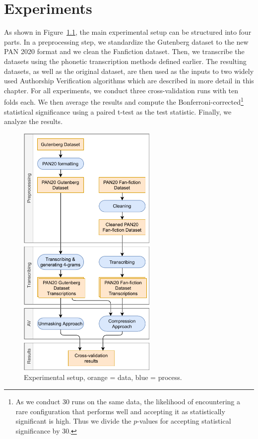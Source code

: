 \chapter{Experiments}\label{experiments}
As shown in Figure~\ref{fig:process}, the main experimental setup can be structured into four parts.
In a preprocessing step, we standardize the Gutenberg dataset to the new PAN 2020 format and we clean the Fanfiction dataset.
Then, we transcribe the datasets using the phonetic transcription methods defined earlier.
The resulting datasets, as well as the original dataset, are then used as the inputs to two widely used Authorship Verification algorithms which are described in more detail in this chapter.
For all experiments, we conduct three cross-validation runs with ten folds each.
We then average the results and compute the Bonferroni-corrected\footnote{As we conduct 30 runs on the same data, the likelihood of encountering a rare configuration that performs well and accepting it as statistically significant is high. Thus we divide the $p$-values for accepting statistical significance by 30.} statistical significance using a paired t-test as the test statistic.
Finally, we analyze the results.
\begin{figure}
  \centering
  \includegraphics[width=0.6\textwidth]{figures/process}
  \caption{Experimental setup, orange = data, blue = process.}
  \label{fig:process}
\end{figure}

